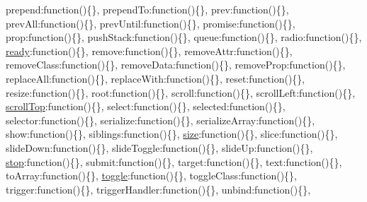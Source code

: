 \begin{DoxyCompactItemize}
\textquotesingle{}prepend\textquotesingle{}\+:function()\{\}, \textquotesingle{}prepend\+To\textquotesingle{}\+:function()\{\}, \textquotesingle{}prev\textquotesingle{}\+:function()\{\}, \textquotesingle{}prev\+All\textquotesingle{}\+:function()\{\}, \textquotesingle{}prev\+Until\textquotesingle{}\+:function()\{\}, \textquotesingle{}promise\textquotesingle{}\+:function()\{\}, \textquotesingle{}prop\textquotesingle{}\+:function()\{\}, \textquotesingle{}push\+Stack\textquotesingle{}\+:function()\{\}, \textquotesingle{}queue\textquotesingle{}\+:function()\{\}, \textquotesingle{}radio\textquotesingle{}\+:function()\{\}, \textquotesingle{}\hyperlink{_scripts_2_product_edit_8js_a9748b1b21b06efe926035ef9def874ca}{ready}\textquotesingle{}\+:function()\{\}, \textquotesingle{}remove\textquotesingle{}\+:function()\{\}, \textquotesingle{}remove\+Attr\textquotesingle{}\+:function()\{\}, \textquotesingle{}remove\+Class\textquotesingle{}\+:function()\{\}, \textquotesingle{}remove\+Data\textquotesingle{}\+:function()\{\}, \textquotesingle{}remove\+Prop\textquotesingle{}\+:function()\{\}, \textquotesingle{}replace\+All\textquotesingle{}\+:function()\{\}, \textquotesingle{}replace\+With\textquotesingle{}\+:function()\{\}, \textquotesingle{}reset\textquotesingle{}\+:function()\{\}, \textquotesingle{}resize\textquotesingle{}\+:function()\{\}, \textquotesingle{}root\textquotesingle{}\+:function()\{\}, \textquotesingle{}scroll\textquotesingle{}\+:function()\{\}, \textquotesingle{}scroll\+Left\textquotesingle{}\+:function()\{\}, \textquotesingle{}\hyperlink{_scripts_2jquery-1_810_82_8js_a57beb1f611d6c8b84919b0f7d9e0e890}{scroll\+Top}\textquotesingle{}\+:function()\{\}, \textquotesingle{}select\textquotesingle{}\+:function()\{\}, \textquotesingle{}selected\textquotesingle{}\+:function()\{\}, \textquotesingle{}selector\textquotesingle{}\+:function()\{\}, \textquotesingle{}serialize\textquotesingle{}\+:function()\{\}, \textquotesingle{}serialize\+Array\textquotesingle{}\+:function()\{\}, \textquotesingle{}show\textquotesingle{}\+:function()\{\}, \textquotesingle{}siblings\textquotesingle{}\+:function()\{\}, \textquotesingle{}\hyperlink{_scripts_2jquery-1_810_82_8js_afa6806c6ee5e63d5177f1dcc082ba6bc}{size}\textquotesingle{}\+:function()\{\}, \textquotesingle{}slice\textquotesingle{}\+:function()\{\}, \textquotesingle{}slide\+Down\textquotesingle{}\+:function()\{\}, \textquotesingle{}slide\+Toggle\textquotesingle{}\+:function()\{\}, \textquotesingle{}slide\+Up\textquotesingle{}\+:function()\{\}, \textquotesingle{}\hyperlink{_scripts_2jquery-1_810_82_8js_ac9a544302040b74e845b33c285cd10e7}{stop}\textquotesingle{}\+:function()\{\}, \textquotesingle{}submit\textquotesingle{}\+:function()\{\}, \textquotesingle{}target\textquotesingle{}\+:function()\{\}, \textquotesingle{}text\textquotesingle{}\+:function()\{\}, \textquotesingle{}to\+Array\textquotesingle{}\+:function()\{\}, \textquotesingle{}\hyperlink{_scripts_2bootstrap_8min_8js_acf7cf7d86a171d1c082d8bf08f2de490}{toggle}\textquotesingle{}\+:function()\{\}, \textquotesingle{}toggle\+Class\textquotesingle{}\+:function()\{\}, \textquotesingle{}trigger\textquotesingle{}\+:function()\{\}, \textquotesingle{}trigger\+Handler\textquotesingle{}\+:function()\{\}, \textquotesingle{}unbind\textquotesingle{}\+:function()\{\}, 
\end{DoxyCompactItemize}
